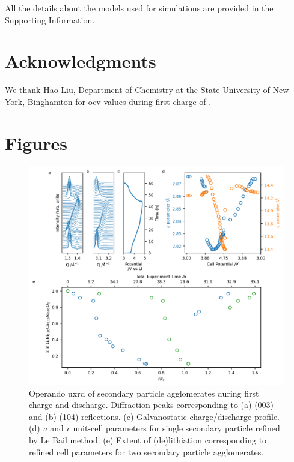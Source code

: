 \documentclass{article}
\begin{document}
All the details about the models used for simulations are provided in the Supporting Information. 


\section*{Acknowledgments}

We thank Hao Liu, Department of Chemistry at the State University of
New York, Binghamton for \gls{ocv} values during first charge of
\nca{}.



\newpage
\section*{Figures}

\begin{figure}[!h]
  \includegraphics{figures/NCA_xrd.png}
  \caption{Operando \gls{uxrd} of \nca{} secondary particle
    agglomerates during first charge and discharge. Diffraction peaks
    corresponding to (a) (003) and (b) (104) reflections. (c)
    Galvanostatic charge/discharge profile. (d) \textit{a} and
    \textit{c} unit-cell parameters for single secondary particle
    refined by Le Bail method. (e) Extent of (de)lithiation
    corresponding to refined cell parameters\cite{robert2015} for two
    secondary particle agglomerates.}
  \label{fig:uxrd}
\end{figure}
\end{document}
